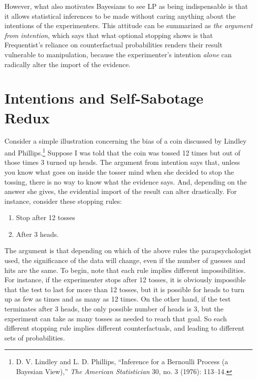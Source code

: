 However, what also motivates Bayesians to see LP as being indispensable
is that it allows statistical inferences to be made without caring
anything about the intentions of the experimenters. This attitude can be
summarized as \emph{the argument from intention}, which says that what
optional stopping shows is that Frequentist's reliance on counterfactual
probabilities renders their result vulnerable to manipulation, because
the experimenter's intention \emph{alone} can radically alter the import
of the evidence.

\hypertarget{intentions-and-self-sabotage-redux}{%
\section{Intentions and Self-Sabotage
Redux}\label{intentions-and-self-sabotage-redux}}

Consider a simple illustration concerning the bias of a coin discussed
by Lindley and Phillips.\footnote{D. V. Lindley and L. D. Phillips,
  ``Inference for a Bernoulli Process (a Bayesian View),'' \emph{The
  American Statistician} 30, no. 3 (1976): 113--14.} Suppose I was told
that the coin was tossed 12 times but out of those times 3 turned up
heads. The argument from intention says that, unless you know what goes
on inside the tosser mind when she decided to stop the tossing, there is
no way to know what the evidence says. And, depending on the answer she
gives, the evidential import of the result can alter drastically. For
instance, consider these stopping rules:

\begin{enumerate}
\def\labelenumi{\arabic{enumi}.}
\tightlist
\item
  Stop after 12 tosses
\item
  After 3 heads.
\end{enumerate}

The argument is that depending on which of the above rules the
parapsychologist used, the significance of the data will change, even if
the number of guesses and hits are the same. To begin, note that each
rule implies different impossibilities. For instance, if the
experimenter stops after 12 tosses, it is obviously impossible that the
test to last for more than 12 tosses, but it is possible for heads to
turn up as few as times and as many as 12 times. On the other hand, if
the test terminates after 3 heads, the only possible number of heads is
3, but the experiment can take as many tosses as needed to reach that
goal. So each different stopping rule implies different counterfactuals,
and leading to different sets of probabilities.

